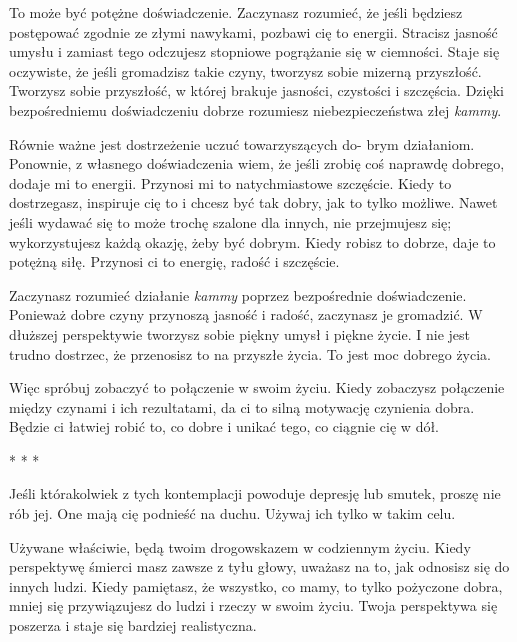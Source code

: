 \documentclass[12pt,openany]{book}
\begin{document}
To może być potężne doświadczenie. Zaczynasz rozumieć, że jeśli będziesz postępować zgodnie ze złymi nawykami, pozbawi cię to energii. Stracisz jasność umysłu i zamiast tego odczujesz stopniowe pogrążanie się w ciemności. Staje się oczywiste, że jeśli gromadzisz takie czyny, tworzysz sobie mizerną przyszłość. Tworzysz sobie przyszłość, w której brakuje jasności, czystości i szczęścia. Dzięki bezpośredniemu doświadczeniu dobrze rozumiesz niebezpieczeństwa złej \textit{kammy}.

Równie ważne jest dostrzeżenie uczuć towarzyszących do- \linebreak brym działaniom. Ponownie, z własnego doświadczenia wiem, że jeśli zrobię coś naprawdę dobrego, dodaje mi to energii. Przynosi mi to natychmiastowe szczęście.  Kiedy to dostrzegasz, inspiruje cię to i chcesz być tak dobry, jak to tylko możliwe. Nawet jeśli wydawać się to może trochę szalone dla innych, nie przejmujesz się; wykorzystujesz każdą okazję, żeby być dobrym. Kiedy robisz to dobrze, daje to potężną siłę. Przynosi ci to energię, radość i szczęście.

Zaczynasz rozumieć działanie \textit{kammy} poprzez bezpośrednie doświadczenie. Ponieważ dobre czyny przynoszą jasność i radość, zaczynasz je gromadzić. W dłuższej perspektywie tworzysz sobie piękny umysł i piękne życie. I nie jest trudno dostrzec, że przenosisz to na przyszłe życia. To jest moc dobrego życia.

Więc spróbuj zobaczyć to połączenie w swoim życiu. Kiedy zobaczysz połączenie między czynami i ich rezultatami, da ci to silną motywację czynienia dobra. Będzie ci łatwiej robić to, co dobre i unikać tego, co ciągnie cię w dół.

\begin{center}
* * *
\end{center}

Jeśli którakolwiek z tych kontemplacji powoduje depresję lub smutek, proszę nie rób jej. One mają cię podnieść na duchu. Używaj ich tylko w takim celu.

Używane właściwie, będą twoim drogowskazem w codziennym życiu. Kiedy perspektywę śmierci masz zawsze z tyłu głowy, uważasz na to, jak odnosisz się do innych ludzi. Kiedy pamiętasz, że wszystko, co mamy, to tylko pożyczone dobra, mniej się przywiązujesz do ludzi i rzeczy w swoim życiu. Twoja perspektywa się poszerza i staje się bardziej realistyczna.
\end{document}
